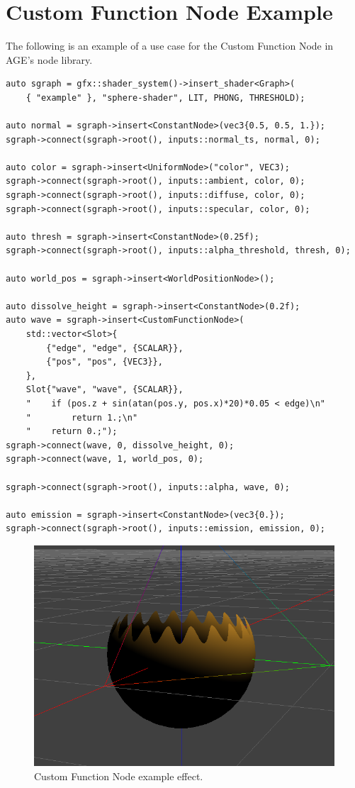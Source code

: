 \documentclass[
  digital,     %
  oneside,     %
  nosansbold,  %
  nocolorbold, %
  lof,         %
  lot,         %
]{fithesis4}
\begin{document}
\chapter{Custom Function Node Example}\label{app:custom-function-node-example}
The following is an example of a use case for the Custom Function Node in AGE's node library.
\begin{verbatim}
auto sgraph = gfx::shader_system()->insert_shader<Graph>(
    { "example" }, "sphere-shader", LIT, PHONG, THRESHOLD);

auto normal = sgraph->insert<ConstantNode>(vec3{0.5, 0.5, 1.});
sgraph->connect(sgraph->root(), inputs::normal_ts, normal, 0);

auto color = sgraph->insert<UniformNode>("color", VEC3);
sgraph->connect(sgraph->root(), inputs::ambient, color, 0);
sgraph->connect(sgraph->root(), inputs::diffuse, color, 0);
sgraph->connect(sgraph->root(), inputs::specular, color, 0);

auto thresh = sgraph->insert<ConstantNode>(0.25f);
sgraph->connect(sgraph->root(), inputs::alpha_threshold, thresh, 0);

auto world_pos = sgraph->insert<WorldPositionNode>();

auto dissolve_height = sgraph->insert<ConstantNode>(0.2f);
auto wave = sgraph->insert<CustomFunctionNode>(
    std::vector<Slot>{
        {"edge", "edge", {SCALAR}},
        {"pos", "pos", {VEC3}},
    },
    Slot{"wave", "wave", {SCALAR}},
    "    if (pos.z + sin(atan(pos.y, pos.x)*20)*0.05 < edge)\n"
    "        return 1.;\n"
    "    return 0.;");
sgraph->connect(wave, 0, dissolve_height, 0);
sgraph->connect(wave, 1, world_pos, 0);

sgraph->connect(sgraph->root(), inputs::alpha, wave, 0);

auto emission = sgraph->insert<ConstantNode>(vec3{0.});
sgraph->connect(sgraph->root(), inputs::emission, emission, 0);
\end{verbatim}
\begin{figure}[H]
    \centering
    \includegraphics[width=\textwidth]{images/custom-function-node-effect.png}
    \caption{Custom Function Node example effect.}
    \label{fig:custom-function-node-example}
\end{figure}
\end{document}
